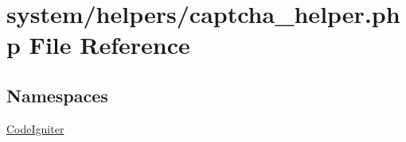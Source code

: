 \hypertarget{captcha__helper_8php}{\section{system/helpers/captcha\-\_\-helper.php File Reference}
\label{captcha__helper_8php}
}
\subsection*{Namespaces}
\begin{DoxyCompactItemize}
\item 
\hyperlink{namespace_code_igniter}{Code\-Igniter}
\end{DoxyCompactItemize}
